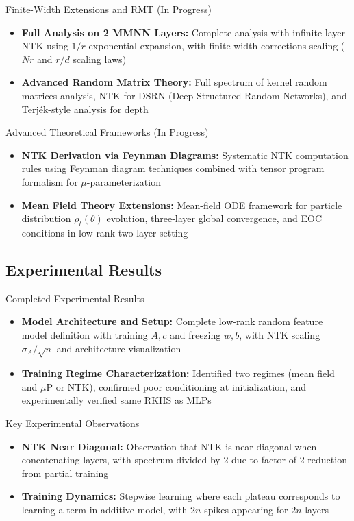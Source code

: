 \documentclass[aspectratio=169]{beamer}
\begin{document}
\begin{frame}{Finite-Width Extensions and RMT (In Progress)}
\begin{itemize}
\item \textbf{Full Analysis on 2 MMNN Layers:} Complete analysis with infinite layer NTK using $1/r$ exponential expansion, with finite-width corrections scaling ($Nr$ and $r/d$ scaling laws)
\item \textbf{Advanced Random Matrix Theory:} Full spectrum of kernel random matrices analysis, NTK for DSRN (Deep Structured Random Networks), and Terjék-style analysis for depth
\end{itemize}
\end{frame}

\begin{frame}{Advanced Theoretical Frameworks (In Progress)}
\begin{itemize}
\item \textbf{NTK Derivation via Feynman Diagrams:} Systematic NTK computation rules using Feynman diagram techniques combined with tensor program formalism for $\mu$-parameterization
\item \textbf{Mean Field Theory Extensions:} Mean-field ODE framework for particle distribution $\rho_t(\theta)$ evolution, three-layer global convergence, and EOC conditions in low-rank two-layer setting
\end{itemize}
\end{frame}

\subsection{Experimental Results}

\begin{frame}{Completed Experimental Results}
\begin{itemize}
\item \textbf{Model Architecture and Setup:} Complete low-rank random feature model definition with training $A, c$ and freezing $w, b$, with NTK scaling $\sigma_A/\sqrt{n}$ and architecture visualization
\item \textbf{Training Regime Characterization:} Identified two regimes (mean field and $\mu$P or NTK), confirmed poor conditioning at initialization, and experimentally verified same RKHS as MLPs
\end{itemize}
\end{frame}

\begin{frame}{Key Experimental Observations}
\begin{itemize}
\item \textbf{NTK Near Diagonal:} Observation that NTK is near diagonal when concatenating layers, with spectrum divided by 2 due to factor-of-2 reduction from partial training
\item \textbf{Training Dynamics:} Stepwise learning where each plateau corresponds to learning a term in additive model, with $2n$ spikes appearing for $2n$ layers
\end{itemize}
\end{frame}
\end{document}
